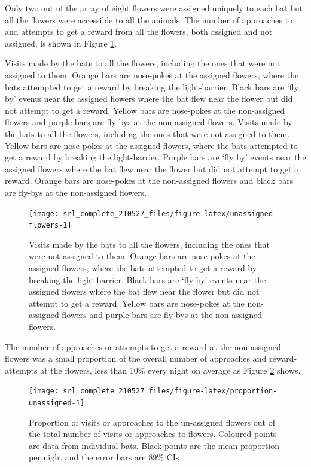 \documentclass[
]{article}
\begin{document}
Only two out of the array of eight flowers were assigned uniquely to each bat but all the flowers were accessible to all the animals. The number of approaches to and attempts to get a reward from all the flowers, both assigned and not assigned, is shown in Figure \ref{fig:unassigned-flowers}.



Visits made by the bats to all the flowers, including the ones that were not assigned to them. Orange bars are nose-pokes at the assigned flowers, where the bats attempted to get a reward by breaking the light-barrier. Black bars are `fly by' events near the assigned flowers where the bat flew near the flower but did not attempt to get a reward. Yellow bars are nose-pokes at the non-assigned flowers and purple bars are fly-bys at the non-assigned flowers. Visits made by the bats to all the flowers, including the ones that were not assigned to them. Yellow bars are nose-pokes at the assigned flowers, where the bats attempted to get a reward by breaking the light-barrier. Purple bars are `fly by' events near the assigned flowers where the bat flew near the flower but did not attempt to get a reward. Orange bars are nose-pokes at the non-assigned flowers and black bars are fly-bys at the non-assigned flowers.

\begin{figure}[H]

{\centering \texttt{[image: srl\_complete\_210527\_files/figure-latex/unassigned-flowers-1]} 

}

\caption{Visits made by the bats to all the flowers, including the ones that were not assigned to them. Orange bars are nose-pokes at the assigned flowers, where the bats attempted to get a reward by breaking the light-barrier. Black bars are `fly by' events near the assigned flowers where the bat flew near the flower but did not attempt to get a reward. Yellow bars are nose-pokes at the non-assigned flowers and purple bars are fly-bys at the non-assigned flowers.}\label{fig:unassigned-flowers}
\end{figure}

The number of approaches or attempts to get a reward at the non-assigned flowers was a small proportion of the overall number of approaches and reward-attempts at the flowers, less than 10\% every night on average as Figure \ref{fig:proportion-unassigned} shows.



\begin{figure}[H]

{\centering \texttt{[image: srl\_complete\_210527\_files/figure-latex/proportion-unassigned-1]} 

}

\caption{Proportion of visits or approaches to the un-assigned flowers out of the total number of visits or approaches to flowers. Coloured points are data from individual bats. Black points are the mean proportion per night and the error bars are 89\% CIs}\label{fig:proportion-unassigned}
\end{figure}
\end{document}
